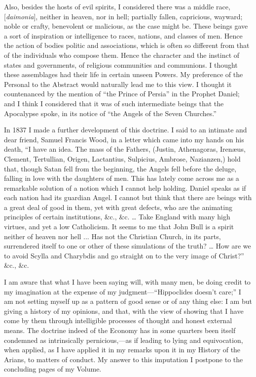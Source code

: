 Also, besides the hosts of evil spirits, I considered there was a
middle race, [\emph{daimonia}],
neither in heaven, nor in hell; partially fallen, capricious,
wayward; noble or crafty, benevolent or malicious, as the case might
be. These beings gave a sort
of inspiration or intelligence to races, nations, and classes of men.
Hence the action of bodies politic and associations, which is often so
different from
that of the individuals who compose them. Hence the character and the
instinct of states and governments, of religious communities and
communions. I thought these assemblages had their life in certain unseen
Powers. My preference of the Personal to the Abstract would naturally
lead me to this view. I thought it countenanced by the mention of
``the Prince of Persia'' in the Prophet Daniel; and I think I
considered that it was of such intermediate beings that the Apocalypse
spoke, in its notice of ``the Angels of the Seven Churches.''

In 1837 I made a further development of this doctrine. I said to an intimate and dear
friend, Samuel
Francis Wood, in a letter which came into my hands on his death,
``I have an idea. The mass of the Fathers, (Justin, Athenagoras,
Irenæus, Clement, Tertullian, Origen, Lactantius, Sulpicius, Ambrose,
Nazianzen,) hold that, though Satan fell from the beginning, the
Angels fell before the deluge, falling in love with the daughters of
men. This has lately come across me as a remarkable solution of a
notion which I cannot help holding. Daniel speaks as if each nation
had its guardian Angel. I cannot but think that there are beings with
a great deal of good in them, yet with great defects, who are the
animating principles of certain institutions, \&c., \&c. …
Take England with many high virtues, and yet a low Catholicism. It
seems to me that John Bull is a spirit neither of heaven nor hell ...
Has not the Christian Church, in its parts, surrendered itself to one
or other of these simulations of the truth? … How are we to avoid
Scylla and Charybdis and go straight on to the very image of
Christ?'' \&c., \&c.

I am aware that what I have been saying will, with many men, be
doing credit to my imagination at the expense of my judgment—``Hippoclides
doesn't care;'' I am not setting myself up as a pattern of good
sense or of any thing else: I am but giving a history of my
opinions, and that, with the view of showing that I have come by them
through intelligible processes of thought and honest external means.
The doctrine indeed of the Economy has in some quarters been itself
condemned as intrinsically pernicious,—as if leading to lying and
equivocation, when applied, as I have applied it in my remarks upon it
in my History of the Arians, to matters of conduct. My answer to this
imputation I postpone to the concluding pages of my Volume.

